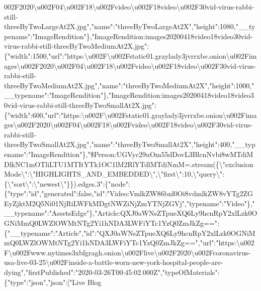 002F2020\textbackslash{}u002F04\textbackslash{}u002F18\textbackslash{}u002Fvideo\textbackslash{}u002F18video\textbackslash{}u002F30vid-virus-rabbi-still-threeByTwoLargeAt2X.jpg","name":"threeByTwoLargeAt2X","height":1080,"\_\_typename":"ImageRendition"\},"ImageRendition:images20200418video18video30vid-virus-rabbi-still-threeByTwoMediumAt2X.jpg":\{"width":1500,"url":"https:\textbackslash{}u002F\textbackslash{}u002Fstatic01.graylady3jvrrxbe.onion\textbackslash{}u002Fimages\textbackslash{}u002F2020\textbackslash{}u002F04\textbackslash{}u002F18\textbackslash{}u002Fvideo\textbackslash{}u002F18video\textbackslash{}u002F30vid-virus-rabbi-still-threeByTwoMediumAt2X.jpg","name":"threeByTwoMediumAt2X","height":1000,"\_\_typename":"ImageRendition"\},"ImageRendition:images20200418video18video30vid-virus-rabbi-still-threeByTwoSmallAt2X.jpg":\{"width":600,"url":"https:\textbackslash{}u002F\textbackslash{}u002Fstatic01.graylady3jvrrxbe.onion\textbackslash{}u002Fimages\textbackslash{}u002F2020\textbackslash{}u002F04\textbackslash{}u002F18\textbackslash{}u002Fvideo\textbackslash{}u002F18video\textbackslash{}u002F30vid-virus-rabbi-still-threeByTwoSmallAt2X.jpg","name":"threeByTwoSmallAt2X","height":400,"\_\_typename":"ImageRendition"\},"\$Person:UGVyc29uOm55dDovL3BlcnNvbi8wMTdiMDlkNC1mOTliLTU1MTItYTk1OC1lM2RlYTdlMTdiNmM=.stream(\{\textbackslash{}"exclusionMode\textbackslash{}":\textbackslash{}"HIGHLIGHTS\_AND\_EMBEDDED\textbackslash{}",\textbackslash{}"first\textbackslash{}":10,\textbackslash{}"query\textbackslash{}":\{\textbackslash{}"sort\textbackslash{}":\textbackslash{}"newest\textbackslash{}"\}\}).edges.3":\{"node":\{"type":"id","generated":false,"id":"Video:VmlkZW86bnl0Oi8vdmlkZW8vYTg2ZGEyZjktM2Q5Ni01NjRiLWFkMDgtNWZiNjZmYTNjZGVj","typename":"Video"\},"\_\_typename":"AssetsEdge"\},"Article:QXJ0aWNsZTpueXQ6Ly9hcnRpY2xlLzk0OGNiMmQ0LWZlOWMtNTg2Yi1hNDA3LWFiYTc1YzQ0ZmJkZg==":\{"\_\_typename":"Article","id":"QXJ0aWNsZTpueXQ6Ly9hcnRpY2xlLzk0OGNiMmQ0LWZlOWMtNTg2Yi1hNDA3LWFiYTc1YzQ0ZmJkZg==","url":"https:\textbackslash{}u002F\textbackslash{}u002Fwww.nytimes3xbfgragh.onion\textbackslash{}u002Flive\textbackslash{}u002F2020\textbackslash{}u002Fcoronavirus-usa-live-03-25\textbackslash{}u002Finside-a-battle-worn-new-york-hospital-people-are-dying","firstPublished":"2020-03-26T00:45:02.000Z","typeOfMaterials":\{"type":"json","json":{[}"Live
Blog
